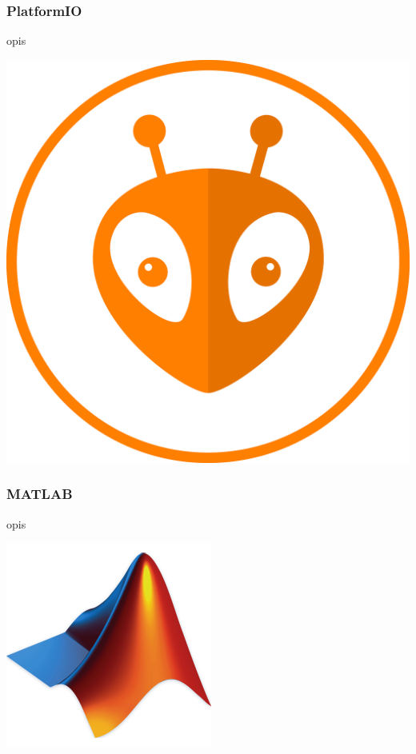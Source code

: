 \subsubsection*{PlatformIO}
opis
\begin{center}
    \includegraphics[scale=0.05]{images/platformio.eps}
    \label{fig:drukarka}
\end{center}

\subsubsection*{MATLAB}
opis
\begin{center}
    \includegraphics[scale=0.4]{images/matlab.png}
    \label{fig:drukarka}
\end{center}

